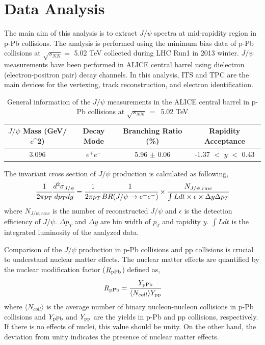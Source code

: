 \chapter{Data Analysis}
\label{chap_ana}
The main aim of this analysis is to extract $J/\psi$ spectra at mid-rapidity region in p-Pb collisions.  
The analysis is performed using the minimum bias data of p-Pb collisions at $\sqrt{s_{NN}} =$ 5.02 TeV collected during LHC Run1 in 2013 winter.
$J/\psi$ measurements have been performed in ALICE central barrel using dielectron (electron-positron pair) decay channels. 
In this analysis, ITS and TPC are the main devices for the vertexing,  track reconstruction, and electron identification.
\begin{table}[!h]
\begin{center}
	\begin{tabular}{cccc} \hline
		$J/\psi$ Mass (GeV/$c$^{2})    & Decay Mode & Branching Ratio (\%) & Rapidity Acceptance \\ \hline
 		3.096                           & $e^{+}e^{-}$   &  5.96  $\pm$ 0.06                         & -1.37 $<$ $y$ $<$ 0.43 \\ \hline
	\end{tabular}
\end{center}
	\caption{General information of the $J/\psi$ measurements in the ALICE central barrel in p-Pb collisions at $\sqrt{s_{NN}}~=$~5.02 TeV}
\end{table}

The invariant cross section of $J/\psi$ production is calculated as following,  
\begin{equation}
  \cfrac{1}{2\pi p_{T}}\cfrac{d^{2}\sigma_{J/\psi}}{dp_{T}dy} =  \cfrac{1}{2\pi p_{T}}\cfrac{1}{BR(J/\psi\rightarrow e^{+}e^{-})} \times \cfrac{N_{J/\psi ,raw}}{\int{L}dt \times \epsilon \times \Delta y \Delta p_{T}}
\end{equation}
where $N_{J/\psi ,raw}$ is the number of reconstructed $J/\psi$ and $\epsilon$ is the detection efficiency of $J/\psi$. 
$\Delta p_{T}$ and $\Delta y$ are bin width of $p_{T}$ and rapidity $y$. 
$\int{L}dt$ is the integrated luminosity of the analyzed data.

Comparison of the $J/\psi$ production in p-Pb collisions and pp collisions is crucial to understand nuclear matter effects. 
The nuclear matter effects are quantified by the nuclear modification factor ($R_{\rm{pPb}}$) defined as, 
\begin{equation}
  R_{\rm{pPb}} = \cfrac{Y_{\rm{pPb}}}{\langle N_{coll}\rangle Y_{\rm{pp}}}
\end{equation}
where $\langle N_{coll}\rangle$ is the average number of binary nucleon-nucleon collisions in p-Pb collisions and $Y_{\rm{pPb}}$ and $Y_{\rm{pp}}$ are the yields in p-Pb and pp collisions, respectively.
If there is no effects of nuclei, this value should be unity. 
On the other hand, the deviation from unity indicates the presence of nuclear matter effects.

